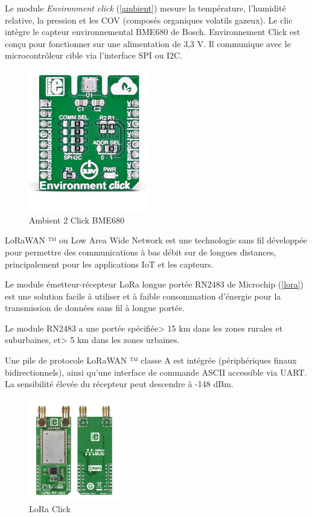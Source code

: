\documentclass[12pt]{article}
\begin{document}
Le module \textit{Environment click} (\autoref{ambient}) mesure la température, l'humidité relative, la pression et les COV (composés organiques volatils gazeux). Le clic intègre le capteur environnemental BME680 de Bosch. Environnement Click est conçu pour fonctionner sur une alimentation de 3,3 V. Il communique avec le microcontrôleur cible via l'interface SPI ou I2C.

\begin{figure}[!h]
	\centering
	\includegraphics[width=200px]{ambient}
	\caption{Ambient 2 Click BME680}
	\label{ambient}
\end{figure}

\newpage
LoRaWAN ™ ou Low Area Wide Network est une technologie sans fil développée pour permettre des communications à bas débit sur de longues distances, principalement pour les applications IoT et les capteurs.

Le module émetteur-récepteur LoRa longue portée RN2483 de Microchip (\autoref{lora}) est une solution facile à utiliser et à faible consommation d'énergie pour la transmission de données sans fil à longue portée.

Le module RN2483 a une portée spécifiée> 15 km dans les zones rurales et suburbaines, et> 5 km dans les zones urbaines.

Une pile de protocole LoRaWAN ™ classe A est intégrée (périphériques finaux bidirectionnels), ainsi qu'une interface de commande ASCII accessible via UART. La sensibilité élevée du récepteur peut descendre à -148 dBm.
\begin{figure}[!h]
	\centering
	\includegraphics[width=150px]{lora}
	\caption{LoRa Click}
	\label{lora}
\end{figure}
\end{document}
